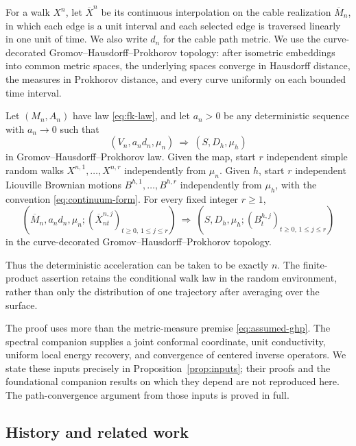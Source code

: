 For a walk $X^n$, let $\overline X^n$ be its continuous interpolation on
the cable realization $\overline M_n$, in which each edge is a unit
interval and each selected edge is traversed linearly in one unit of
time. We also write $d_n$ for the cable path metric. We use the
curve-decorated Gromov--Hausdorff--Prokhorov topology: after isometric
embeddings into common metric spaces, the underlying spaces converge in
Hausdorff distance, the measures in Prokhorov distance, and every curve
uniformly on each bounded time interval.

\begin{theorem}\label{thm:main}
Let $(M_n,A_n)$ have law \eqref{eq:fk-law}, and let $a_n>0$ be any
deterministic sequence with $a_n\to0$ such that
\begin{equation}\label{eq:assumed-ghp}
 (V_n,a_nd_n,\mu_n)\ \Longrightarrow\ (S,D_h,\mu_h)
\end{equation}
in Gromov--Hausdorff--Prokhorov law. Given the map, start $r$ independent
simple random walks $X^{n,1},\ldots,X^{n,r}$ independently from $\mu_n$.
Given $h$, start $r$ independent Liouville Brownian motions
$B^{h,1},\ldots,B^{h,r}$ independently from $\mu_h$, with the convention
\eqref{eq:continuum-form}. For every fixed integer $r\ge1$,
\begin{equation}\label{eq:main-limit}
 \left(\overline M_n,a_nd_n,\mu_n;
       (\overline X^{n,j}_{nt})_{t\ge0,\,1\le j\le r}\right)
 \ \Longrightarrow\
 \left(S,D_h,\mu_h;
       (B^{h,j}_t)_{t\ge0,\,1\le j\le r}\right)
\end{equation}
in the curve-decorated Gromov--Hausdorff--Prokhorov topology.
\end{theorem}

Thus the deterministic acceleration can be taken to be exactly $n$.
The finite-product assertion retains the conditional walk law in the
random environment, rather than only the distribution of one trajectory
after averaging over the surface.

The proof uses more than the metric-measure premise
\eqref{eq:assumed-ghp}. The spectral companion supplies a joint conformal
coordinate, unit conductivity, uniform local energy recovery, and
convergence of centered inverse operators. We state these inputs
precisely in Proposition~\ref{prop:inputs}; their proofs and the
foundational companion results on which they depend are not reproduced
here. The path-convergence argument from those inputs is proved in full.

\subsection{History and related work}

